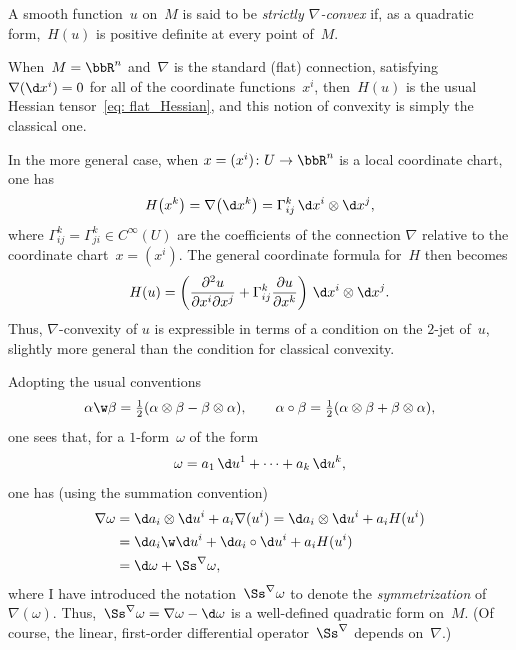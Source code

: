 A smooth function~$u$ on~$M$ is said to be {\it strictly $\nabla$-convex}
if, as a quadratic form,~$H(u)$ is positive definite at every point of~$M$.

When~$M=\bbR^n$ and~$\nabla$ is the standard (flat) connection,
satisfying~$\nabla(\d x^i) = 0$ for all of the coordinate functions~$x^i$,
then~$H(u)$ is the usual Hessian tensor~\eqref{eq: flat_Hessian},
and this notion of convexity is simply the classical one.

In the more general case, when $x = (x^i)\colon U\to \bbR^n$ is a local
coordinate chart, one has
\begin{equation*}
H\big(x^k\big) = \nabla\big(\d x^k\big) = \Gamma^k_{ij}\,\d x^i\otimes\d x^j,
\end{equation*}
where $\Gamma^k_{ij}=\Gamma^k_{ji}\in C^\infty(U)$
are the coefficients of the connection $\nabla$ relative
to the coordinate chart~$x=(x^i)$.
The general coordinate formula for~$H$ then becomes
\begin{equation*}
H(u) = \left(\frac{\partial^2 u}{\partial x^i\partial x^j}
+ \Gamma^k_{ij} \frac{\partial u}{\partial x^k}\right)
\,\d x^i\otimes\d x^j.
\end{equation*}
Thus, $\nabla$-convexity of $u$ is expressible in terms of a condition
on the $2$-jet of~$u$, slightly more general than the condition for
classical convexity.

Adopting the usual conventions
\begin{equation*}%
\alpha\w\beta
= \tfrac12(\alpha\otimes\beta-\beta\otimes\alpha), \qquad
\alpha\circ\beta
= \tfrac12(\alpha\otimes\beta+\beta\otimes\alpha),
\end{equation*}
one sees that, for a $1$-form~$\omega$ of the form
\begin{equation}\label{eq: P-Drepresentation}
\omega = a_1\,\d u^1 + \cdots + a_k\,\d u^k,
\end{equation}
one has (using the summation convention)
\begin{align*}
\nabla\omega
&= \d a_i\otimes\d u^i + a_i \nabla(u^i) = \d a_i\otimes\d u^i + a_i H(u^i)\\
&= \d a_i\w\d u^i + \d a_i\circ\d u^i + a_i H(u^i)\\
&= \d\omega + \Ss^\nabla\omega,
\end{align*}
where I have introduced
the notation~$\Ss^\nabla\omega$ to denote the {\it symmetrization\/}
of~$\nabla(\omega)$. Thus,~$\Ss^\nabla\omega
= \nabla\omega- \d\omega$
is a well-defined quadratic form on~$M$.
(Of course, the linear, first-order differential operator~$\Ss^\nabla$
depends on~$\nabla$.)


